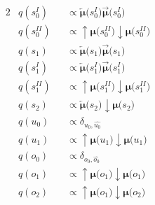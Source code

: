 \documentclass[fleqn]{article}
\begin{document}
\begin{minipage}[t]{0.5\textwidth}
\begin{alignat}{2}
         & q(s^{\scriptscriptstyle I}_0)                             &  & \propto \bm{\overleftarrow{\mu}(}s^{\scriptscriptstyle I}_0\bm{)} \bm{\overrightarrow{\mu}(}s^{\scriptscriptstyle I}_0\bm{)}     \\
         & q(s^{\scriptscriptstyle II}_0)                            &  & \propto \bm{{\uparrow}{\mu}(}s^{\scriptscriptstyle II}_0\bm{)} \bm{{\downarrow}{\mu}(}s^{\scriptscriptstyle II}_0\bm{)}          \\
         & q(s_1)                                                    &  & \propto \bm{\overleftarrow{\mu}(}s_1\bm{)} \bm{\overrightarrow{\mu}(}s_1\bm{)}                                                   \\
         & q(s^{\scriptscriptstyle I}_1)                             &  & \propto \bm{\overleftarrow{\mu}(}s^{\scriptscriptstyle I}_1\bm{)} \bm{\overrightarrow{\mu}(}s^{\scriptscriptstyle I}_1\bm{)}     \\
         & q(s^{\scriptscriptstyle II}_1)                            &  & \propto \bm{{\uparrow}{\mu}(}s^{\scriptscriptstyle II}_1\bm{)} \bm{{\downarrow}{\mu}(}s^{\scriptscriptstyle II}_1\bm{)}          \\
         & q(s_2)                                                    &  & \propto \bm{\overleftarrow{\mu}(}s_2\bm{)} \bm{{\downarrow}{\mu}(}s_2\bm{)}                                                      \\
         & q(u_0)                                                    &  & \propto \delta_{u_0,\hat{u_0}}                                                                                                   \\
         & q(u_1)                                                    &  & \propto \bm{{\uparrow}{\mu}(}u_1\bm{)} \bm{{\downarrow}{\mu}(}u_1\bm{)}                                                          \\
         & q(o_0)                                                    &  & \propto \delta_{o_0,\hat{o_0}}                                                                                                   \\
         & q(o_1)                                                    &  & \propto \bm{{\uparrow}{\mu}(}o_1\bm{)} \bm{{\downarrow}{\mu}(}o_1\bm{)}                                                          \\
         & q(o_2)                                                    &  & \propto \bm{{\uparrow}{\mu}(}o_1\bm{)} \bm{{\downarrow}{\mu}(}o_2\bm{)}
    \end{alignat}
\end{minipage}
\end{document}
